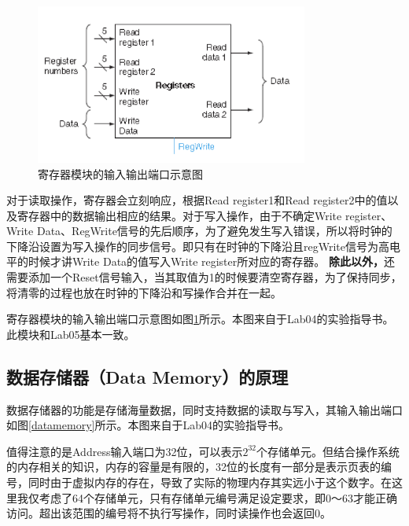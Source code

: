 \begin{figure}[!h]
    \centering
    \includegraphics[width=0.8\textwidth]{./register.png}
    \caption{寄存器模块的输入输出端口示意图}
    \label{register}
\end{figure}

对于读取操作，寄存器会立刻响应，根据Read register1和Read register2中的值以及寄存器中的数据输出相应的结果。对于写入操作，由于不确定Write register、Write Data、RegWrite信号的先后顺序，为了避免发生写入错误，所以将时钟的下降沿设置为写入操作的同步信号。即只有在时钟的下降沿且regWrite信号为高电平的时候才讲Write Data的值写入Write register所对应的寄存器。
\textbf{除此以外，}还需要添加一个Reset信号输入，当其取值为1的时候要清空寄存器，为了保持同步，将清零的过程也放在时钟的下降沿和写操作合并在一起。

寄存器模块的输入输出端口示意图如图\ref{register}所示。本图来自于Lab04的实验指导书。此模块和Lab05基本一致。

\subsection{数据存储器（Data Memory）的原理}
数据存储器的功能是存储海量数据，同时支持数据的读取与写入，其输入输出端口如图\ref{datamemory}所示。本图来自于Lab04的实验指导书。

值得注意的是Address输入端口为32位，可以表示$2^{32}$个存储单元。但结合操作系统的内存相关的知识，内存的容量是有限的，32位的长度有一部分是表示页表的编号，同时由于虚拟内存的存在，导致了实际的物理内存其实远小于这个数字。在这里我仅考虑了64个存储单元，只有存储单元编号满足设定要求，即0～63才能正确访问。超出该范围的编号将不执行写操作，同时读操作也会返回0。


